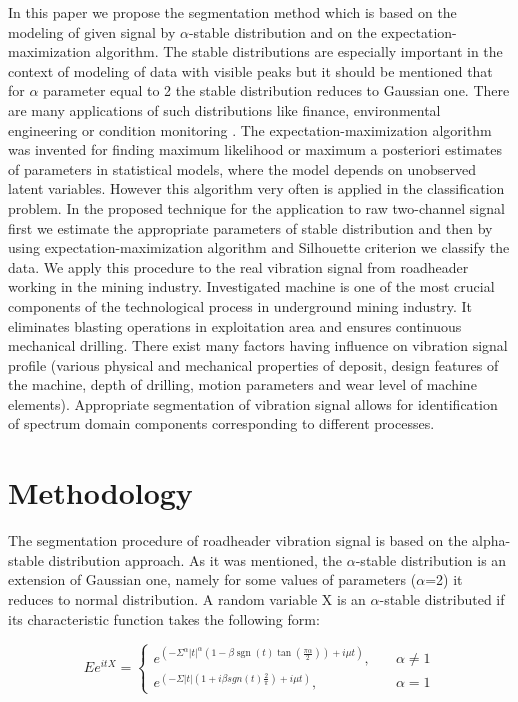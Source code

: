 \documentclass[10pt]{article}
\newcommand{\sgn}{\operatorname{sgn}}
\begin{document}
In this paper we propose the segmentation method which is based on the modeling of given signal by $\alpha$-stable distribution and on the expectation-maximization algorithm. The stable distributions are especially important in the context of modeling of data with visible peaks but it should be mentioned that for $\alpha$ parameter equal to 2 the stable distribution reduces to Gaussian one. There are many applications of such distributions like finance, environmental engineering or condition monitoring \cite{zak2014application}. The expectation-maximization algorithm was invented for finding maximum likelihood or maximum a posteriori estimates of parameters in statistical models, where the model depends on unobserved latent variables. However this algorithm very often is applied in the classification problem. In the proposed technique for the application to raw two-channel signal first we estimate the appropriate parameters of stable distribution and then by using expectation-maximization algorithm and Silhouette criterion we classify the data. We apply this procedure to the real vibration signal from roadheader working in the mining industry. Investigated machine is one of the most crucial components of the technological process in underground mining industry. It eliminates blasting operations in exploitation area and ensures continuous mechanical drilling. There exist many factors having influence on vibration signal profile (various physical and mechanical properties of deposit, design features of the machine, depth of drilling, motion parameters and wear level of machine elements). Appropriate segmentation of vibration signal allows for identification of spectrum domain components corresponding to different processes.

\section{Methodology}
The segmentation procedure of roadheader vibration signal is based on the alpha-stable distribution approach. As it was mentioned, the $\alpha$-stable distribution is an extension of Gaussian one, namely for some values of parameters ($\alpha$=2) it reduces to normal distribution. A random variable X is an $\alpha$-stable distributed if its characteristic function takes the following form:

\begin{equation}
Ee^{itX} =
  \begin{cases}
    e^{\left(-\Sigma^\alpha |t|^\alpha \left(1-\beta \sgn(t)\tan\left(\frac{\pi\alpha}{2}\right) \right) +i\mu t \right)},    & \quad \alpha \neq 1\\
    e^{\left(-\Sigma |t| \left(1+i\beta sgn(t)\frac{2}{\pi}\right) +i\mu t \right)},  & \quad \alpha = 1
  \end{cases}
  \label{eq1}
\end{equation}
\end{document}
